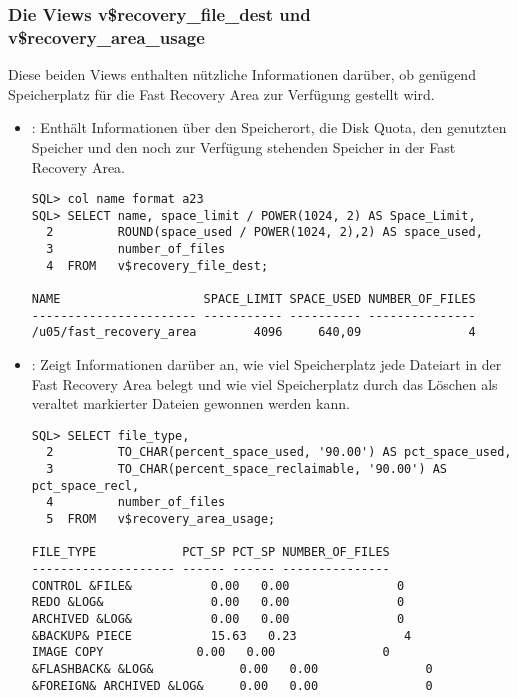         \subsubsection{Die Views v\$recovery\_file\_dest und v\$recovery\_area\_usage}
          Diese beiden Views enthalten nützliche Informationen darüber, ob genügend Speicherplatz für die Fast Recovery Area zur Verfügung gestellt wird.
          \begin{itemize}
            \item {}: Enthält Informationen
            über den Speicherort, die Disk Quota, den genutzten Speicher und
            den noch zur Verfügung stehenden Speicher in der Fast Recovery
            Area.
            \begin{lstlisting}[caption={\identifier{v\$recovery\_file\_dest}},label=admin1035,language=oracle_sql]
SQL> col name format a23
SQL> SELECT name, space_limit / POWER(1024, 2) AS Space_Limit,
  2         ROUND(space_used / POWER(1024, 2),2) AS space_used, 
  3         number_of_files
  4  FROM   v$recovery_file_dest;

NAME                    SPACE_LIMIT SPACE_USED NUMBER_OF_FILES
----------------------- ----------- ---------- ---------------
/u05/fast_recovery_area        4096     640,09               4

            \end{lstlisting}

           \item {}: Zeigt Informationen darüber an, wie viel Speicherplatz jede Dateiart in der Fast Recovery Area belegt und wie viel Speicherplatz durch das Löschen als veraltet markierter Dateien gewonnen werden kann.
            \begin{lstlisting}[caption={\identifier{v\$recovery\_area\_usage}},label=admin1036,language=oracle_sql]
SQL> SELECT file_type,
  2         TO_CHAR(percent_space_used, '90.00') AS pct_space_used,
  3         TO_CHAR(percent_space_reclaimable, '90.00') AS pct_space_recl,
  4         number_of_files
  5  FROM   v$recovery_area_usage;
  
FILE_TYPE            PCT_SP PCT_SP NUMBER_OF_FILES
-------------------- ------ ------ ---------------
CONTROL &FILE&           0.00   0.00               0
REDO &LOG&               0.00   0.00               0
ARCHIVED &LOG&           0.00   0.00               0
&BACKUP& PIECE           15.63   0.23               4
IMAGE COPY             0.00   0.00               0
&FLASHBACK& &LOG&            0.00   0.00               0
&FOREIGN& ARCHIVED &LOG&     0.00   0.00               0
            \end{lstlisting}
          \end{itemize}

